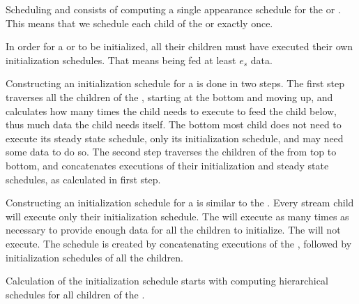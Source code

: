 Scheduling {\pipelines} and {\splitjoin} consists of computing a
single appearance schedule for the {\pipeline} or {\splitjoin}. This
means that we schedule each child of the {\pipeline} or {\splitjoin}
exactly once.

 In order for a
{\pipeline} or {\splitjoin} to be initialized, all their children
must have executed their own initialization schedules. That means
being fed at least $e_s$ data.

Constructing an initialization schedule for a {\pipeline} is done in
two steps. The first step traverses all the children of the
{\pipeline}, starting at the bottom and  moving up, and calculates
how many times the child needs to execute to feed the child below,
thus much data the child needs itself. The bottom most child does
not need to execute its steady state schedule, only its
initialization schedule, and may need some data to do so. The
second step traverses the children of the {\pipeline} from top to
bottom, and concatenates executions of their initialization and
steady state schedules, as calculated in first step.

Constructing an initialization schedule for a {\splitjoin} is
similar to the {\pipeline}. Every stream child will execute only
their initialization schedule. The {\splitter} will execute as many
times as necessary to provide enough data for all the children to
initialize. The {\joiner} will not execute. The schedule is created
by concatenating executions of the {\splitter}, followed by
initialization schedules of all the children.

Calculation of the initialization schedule starts with computing
hierarchical schedules for all children of the {\pipeline}.

